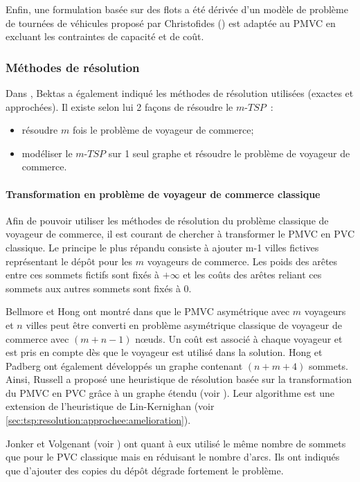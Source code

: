   Enfin, une formulation basée sur des flots a été dérivée d'un modèle de problème de tournées de véhicules proposé par Christofides (\cite{Christofides1981}) est adaptée au PMVC en excluant les contraintes de capacité et de coût.
  
 \subsubsection{Méthodes de résolution}
  Dans \cite{Bektas2006}, Bektas a également indiqué les méthodes de résolution utilisées (exactes et approchées). Il existe selon lui 2 façons de résoudre le $m$-$TSP$~: 
  \begin{itemize}
   \item résoudre $m$ fois le problème de voyageur de commerce; 
   \item modéliser le $m$-$TSP$ sur 1 seul graphe et résoudre le problème de voyageur de commerce.
  \end{itemize}
  
  \paragraph{Transformation en problème de voyageur de commerce classique}
  Afin de pouvoir utiliser les méthodes de résolution du problème classique de voyageur de commerce, il est courant de chercher à transformer le PMVC en PVC classique. Le principe le plus répandu consiste à ajouter m-1 villes fictives représentant le dépôt pour les $m$ voyageurs de commerce. Les poids des arêtes entre ces sommets fictifs sont fixés à $+\infty$ et les coûts des arêtes reliant ces sommets aux autres sommets sont fixés à $0$.
  
  Bellmore et Hong ont montré dans \cite{Bellmore1974} que le PMVC asymétrique avec $m$ voyageurs et $n$ villes peut être converti en problème asymétrique classique de voyageur de commerce avec $(m+n-1)$ nœuds. Un coût est associé à chaque voyageur et est pris en compte dès que le voyageur est utilisé dans la solution. Hong et Padberg ont également développés un graphe contenant $(n+m+4)$ sommets. Ainsi, Russell a proposé une heuristique de résolution basée sur la transformation du PMVC en PVC grâce à un graphe étendu (voir \cite{Russel1977}). Leur algorithme est une extension de l'heuristique de Lin-Kernighan (voir \ref{sec:tsp:resolution:approchee:amelioration}).
  
  Jonker et Volgenant (voir \cite{Jonker1988}) ont quant à eux utilisé le même nombre de sommets que pour le PVC classique mais en réduisant le nombre d'arcs. Ils ont indiqués que d'ajouter des copies du dépôt dégrade fortement le problème.\\
  
